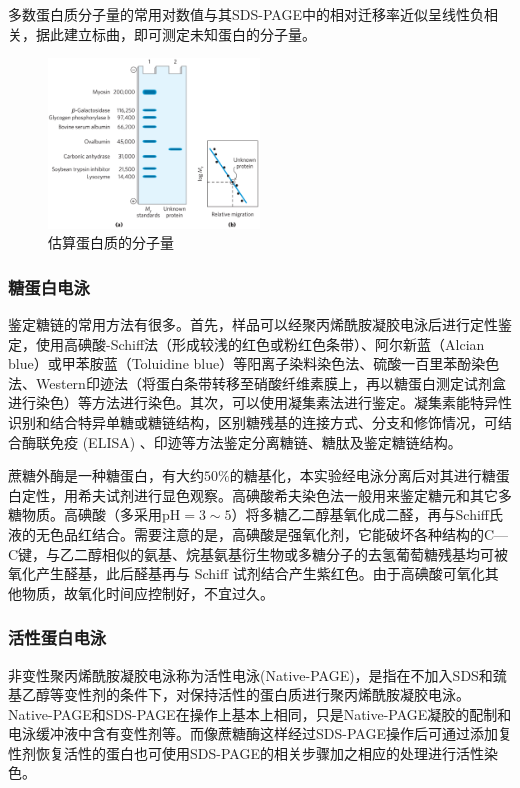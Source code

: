 多数蛋白质分子量的常用对数值与其SDS-PAGE中的相对迁移率近似呈线性负相关，据此建立标曲，即可测定未知蛋白的分子量。
\begin{figure}[H]
    \centering
    \includegraphics[width = 0.5\textwidth]{figure/Some Pictures/Estimating the molecular weight of a protein.png}
    \caption{估算蛋白质的分子量\cite{nelson2021lehninger}}
    \label{fig:enter-label}
\end{figure}

\subsubsection{糖蛋白电泳}
鉴定糖链的常用方法有很多。首先，样品可以经聚丙烯酰胺凝胶电泳后进行定性鉴定，使用高碘酸-Schiff法（形成较浅的红色或粉红色条带）、阿尔新蓝（Alcian blue）或甲苯胺蓝（Toluidine blue）等阳离子染料染色法、硫酸一百里苯酚染色法、Western印迹法（将蛋白条带转移至硝酸纤维素膜上，再以糖蛋白测定试剂盒进行染色）等方法进行染色。其次，可以使用凝集素法进行鉴定。凝集素能特异性识别和结合特异单糖或糖链结构，区别糖残基的连接方式、分支和修饰情况，可结合酶联免疫 (ELISA) 、印迹等方法鉴定分离糖链、糖肽及鉴定糖链结构。

蔗糖外酶是一种糖蛋白，有大约$50\%$的糖基化，本实验经电泳分离后对其进行糖蛋白定性，用希夫试剂进行显色观察。高碘酸希夫染色法一般用来鉴定糖元和其它多糖物质。高碘酸（多采用$\mathrm{pH}=3\sim5$）将多糖乙二醇基氧化成二醛，再与Schiff氏液的无色品红结合。需要注意的是，高碘酸是强氧化剂，它能破坏各种结构的C—C键，与乙二醇相似的氨基、烷基氨基衍生物或多糖分子的去氢葡萄糖残基均可被氧化产生醛基，此后醛基再与 Schiff 试剂结合产生紫红色。由于高碘酸可氧化其他物质，故氧化时间应控制好，不宜过久。

\subsubsection{活性蛋白电泳}
非变性聚丙烯酰胺凝胶电泳称为活性电泳(Native-PAGE)，是指在不加入SDS和巯基乙醇等变性剂的条件下，对保持活性的蛋白质进行聚丙烯酰胺凝胶电泳。Native-PAGE和SDS-PAGE在操作上基本上相同，只是Native-PAGE凝胶的配制和电泳缓冲液中含有变性剂等。而像蔗糖酶这样经过SDS-PAGE操作后可通过添加复性剂恢复活性的蛋白也可使用SDS-PAGE的相关步骤加之相应的处理进行活性染色。

